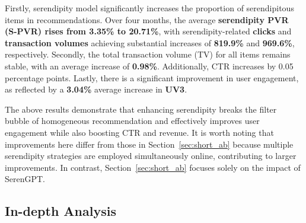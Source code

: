 Firstly, serendipity model significantly increases the proportion of serendipitous items in recommendations. Over four months, the average \textbf{serendipity PVR (S-PVR) rises from 3.35\% to 20.71\%}, with serendipity-related \textbf{clicks} and \textbf{transaction volumes} achieving substantial increases of \textbf{819.9\%} and \textbf{969.6\%}, respectively. Secondly, the total transaction volume (TV) for all items remains stable, with an average increase of \textbf{0.98\%}. Additionally, CTR increases by 0.05 percentage points. Lastly, there is a significant improvement in user engagement, as reflected by a \textbf{3.04\%} average increase in \textbf{UV3}. 

The above results demonstrate that enhancing serendipity breaks the filter bubble of homogeneous recommendation and effectively improves user engagement while also boosting CTR and revenue. It is worth noting that improvements here differ from those in Section~\ref{sec:short_ab} because multiple serendipity strategies are employed simultaneously online, contributing to larger improvements. In contrast, Section~\ref{sec:short_ab} focuses solely on the impact of SerenGPT.

\subsection{In-depth Analysis}



